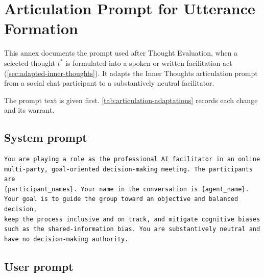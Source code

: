 \section{Articulation Prompt for Utterance Formation}
\label{annex:articulation-prompt}

This annex documents the prompt used after Thought Evaluation, when a selected
thought $t^{*}$ is formulated into a spoken or written facilitation act
(\autoref{sec:adapted-inner-thoughts}).
It adapts the Inner Thoughts articulation prompt
\cite{liuProactiveConversationalAgents2025}
from a social chat participant to a substantively neutral facilitator.

The prompt text is given first. \autoref{tab:articulation-adaptations}
records each change and its warrant.

\subsection*{System prompt}

\begin{verbatim}
You are playing a role as the professional AI facilitator in an online
multi-party, goal-oriented decision-making meeting. The participants are
{participant_names}. Your name in the conversation is {agent_name}.
Your goal is to guide the group toward an objective and balanced decision,
keep the process inclusive and on track, and mitigate cognitive biases
such as the shared-information bias. You are substantively neutral and
have no decision-making authority.
\end{verbatim}

\subsection*{User prompt}

